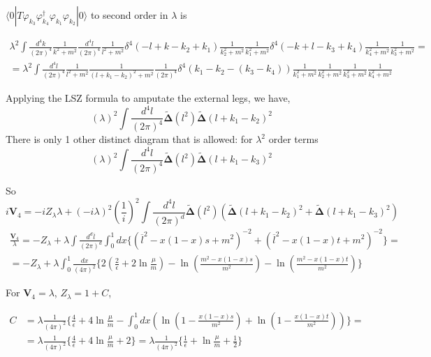 \documentclass[twoside]{amsart}
\begin{document}
$\langle 0 | T \varphi_{k_3}  \varphi_{k_4}^{\dag} \varphi_{k_1} \varphi_{k_2} | 0 \rangle$ to second order in $\lambda$ is   

\[
\begin{gathered}
   \lambda^2 \int \frac{ d^4 k}{ (2\pi)^4} \frac{1 }{ k^2 + m^2 } \frac{ d^4l}{ (2\pi)^4} \frac{1}{ l^2 + m^2 } \delta^4( - l + k - k_2 + k_1 ) \frac{1}{ k_2^2 + m^2 } \frac{1}{ k_1^2  + m^2 } \delta^4(-k + l - k_3 + k_4) \frac{ 1 }{ k_4^2 + m^2 } \frac{1}{ k_3^2 + m^2 } = \\ 
  = \lambda^2  \int \frac{ d^4 l }{ (2\pi)^4} \frac{ 1 }{ l^2 + m^2 } \frac{ 1 }{ (l+k_1 - k_2)^2  + m^2 } \frac{1}{ (2\pi)^4 } \delta^4(k_1 - k_2 - (k_3 - k_4)  ) \frac{1}{ k_1^2 + m^2 }  \frac{1}{ k_2^2 + m^2 } \frac{1}{ k_3^2 + m^2 } \frac{1}{ k_4^2 + m^2 }   
\end{gathered}
\]

Applying the LSZ formula to amputate the external legs, we have,
\[
\left(  \lambda  \right)^2 \int \frac{ d^4l }{(2\pi)^4} \mathbf{\widetilde{\Delta}}(l^2 ) \mathbf{\widetilde{\Delta}}(l + k_1 - k_2)^2 
\]
There is only 1 other distinct diagram that is allowed: for $\lambda^2$ order terms
\[
\left(  \lambda \right)^2 \int \frac{ d^4l }{(2\pi)^4} \mathbf{ \widetilde{\Delta}}(l^2 ) \mathbf{\widetilde{\Delta} }( l + k_1-  k_3)^2
\]


\hrulefill

So
\[
i \mathbf{V}_4 = -i Z_{\lambda} \lambda + \left(  - i \lambda \right)^2 \left( \frac{ 1 }{i} \right)^2 \int \frac{ d^4l}{ (2\pi)^d} \widetilde{\mathbf{\Delta}}(l^2 ) \left( \widetilde{\mathbf{\Delta}}(l + k_1  - k_2)^2 + \widetilde{\mathbf{\Delta}}( l +k_1 - k_3)^2 \right)
\]
\[
\begin{gathered}
  \frac{ \mathbf{V}_4}{\lambda} = - Z_{\lambda} + \lambda \int \frac{ d^d\overline{l}}{ (2\pi)^d} \int_0^1 dx \lbrace ( \overline{l}^2 - x(1-x) s + m^2 )^{-2}  + (\overline{l}^2 - x(1-x) t + m^2 )^{-2} \rbrace = \\
  = - Z_{\lambda} + \lambda \int_0^1 \frac{dx}{ (4\pi)^2 } \lbrace 2 \left( \frac{2}{ \epsilon }+ 2\ln{ \frac{ \mu}{ m } } \right) - \ln{ \left( \frac{ m^2 - x(1-x)s}{ m^2 } \right) } - \ln{ \left( \frac{ m^2 - x(1-x)t }{ m^2 } \right) } \rbrace
\end{gathered}
\]

For $\mathbf{V}_4 = \lambda$, $Z_{\lambda} = 1 + C$,

\[
\begin{aligned}
  C & = \lambda  \frac{ 1}{ (4\pi)^2 } \lbrace \frac{4}{ \epsilon} + 4 \ln{ \frac{ \mu}{ m} } - \int_0^1 dx \left( \ln{ \left( 1 - \frac{ x ( 1-x) s }{ m^2 } \right) } + \ln{ \left( 1 - \frac{ x(1-x) t}{ m^2 } \right) } \right) \rbrace = \\ 
  & =  \lambda  \frac{1}{ (4\pi)^2 } \lbrace \frac{4}{ \epsilon } + 4 \ln{ \frac{ \mu}{ m }} +2 \rbrace = \boxed{  \lambda  \frac{1}{ (4\pi)^2 } \lbrace \frac{1}{ \epsilon} + \ln{ \frac{ \mu}{ m} } + \frac{1}{2} \rbrace } 
\end{aligned}
\]
\end{document}
